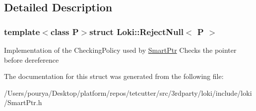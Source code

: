 \subsection{Detailed Description}
\subsubsection*{template$<$class P$>$struct Loki\+::\+Reject\+Null$<$ P $>$}

Implementation of the Checking\+Policy used by \hyperlink{classLoki_1_1SmartPtr}{Smart\+Ptr} Checks the pointer before dereference 

The documentation for this struct was generated from the following file\+:\begin{DoxyCompactItemize}
\item 
/\+Users/pourya/\+Desktop/platform/repos/tetcutter/src/3rdparty/loki/include/loki/Smart\+Ptr.\+h\end{DoxyCompactItemize}
